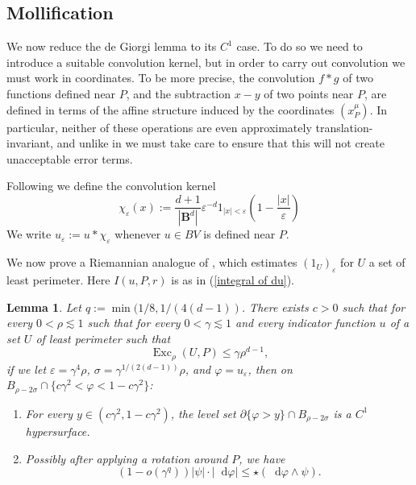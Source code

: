 \documentclass[reqno,11pt]{amsart}
\newcommand{\Ball}{\mathbf{B}}
\DeclareMathOperator{\Exc}{Exc}
\newcommand*\dif{\mathop{}\!\mathrm{d}}
\newtheorem{lemma}[theorem]{Lemma}
\theoremstyle{definition}
\numberwithin{equation}{section}
\begin{document}
\subsection{Mollification}
We now reduce the de Giorgi lemma to its $C^1$ case.
To do so we need to introduce a suitable convolution kernel, but in order to carry out convolution we must work in coordinates.
To be more precise, the convolution $f * g$ of two functions defined near $P$, and the subtraction $x - y$ of two points near $P$, are defined in terms of the affine structure induced by the coordinates $(x^\mu_P)$.
In particular, neither of these operations are even approximately translation-invariant, and unlike in \cite{Giusti77} we must take care to ensure that this will not create unacceptable error terms.

Following \cite[Chapter 7]{Giusti77} we define the convolution kernel
$$\chi_\varepsilon(x) := \frac{d + 1}{|\Ball^d|} \varepsilon^{-d}1_{|x| < \varepsilon} \left(1 - \frac{|x|}{\varepsilon}\right)$$
We write $u_\varepsilon := u * \chi_\varepsilon$ whenever $u \in BV$ is defined near $P$.

We now prove a Riemannian analogue of \cite[Theorem 7.3]{Giusti77}, which estimates $(1_U)_\varepsilon$ for $U$ a set of least perimeter.
Here $I(u, P, r)$ is as in (\ref{integral of du}).

\begin{lemma}\label{main mollifier lemma}
Let $q := \min(1/8, 1/(4(d - 1))$.
There exists $c > 0$ such that for every $0 < \rho \lesssim 1$ such that for every $0 < \gamma \lesssim 1$ and every indicator function $u$ of a set $U$ of least perimeter such that
\begin{equation}\label{hypothesis on main mollifier lemma}
\Exc_\rho(U, P) \leq \gamma \rho^{d - 1},
\end{equation}
if we let $\varepsilon = \gamma^4\rho$, $\sigma = \gamma^{1/(2(d - 1))}\rho$, and $\varphi = u_\varepsilon$, then on $B_{\rho - 2\sigma} \cap \{c\gamma^2 < \varphi < 1 - c\gamma^2\}$:
\begin{enumerate}
\item For every $y \in (c\gamma^2, 1 - c\gamma^2)$, the level set $\partial \{\varphi > y\} \cap B_{\rho - 2\sigma}$ is a $C^1$ hypersurface.
\item Possibly after applying a rotation around $P$, we have
\begin{equation}\label{claim on main mollifier lemma}
(1 - o(\gamma^q)) |\psi| \cdot |\dif \varphi| \leq \star(\dif \varphi \wedge \psi).
\end{equation}
\end{enumerate}
\end{lemma}
\end{document}
